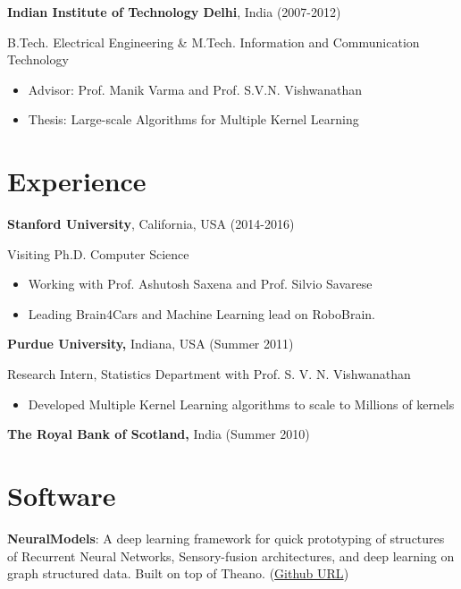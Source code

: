 \documentclass[line,margin]{res}
\begin{document}
\begin{resume}
 {\bf Indian Institute of Technology Delhi}, India  \hfill (2007-2012)
   
 \vspace{-4mm}
  \hspace {4mm } B.Tech. Electrical Engineering \& M.Tech. Information
and Communication Technology
 \begin{itemize} \itemsep -2pt  %
 \item Advisor: Prof. Manik Varma and Prof. S.V.N. Vishwanathan
 \item Thesis: Large-scale Algorithms for Multiple Kernel Learning
 \end{itemize}

\section{Experience}

{\bf Stanford University}, California, USA  \hfill (2014-2016)
 
 \vspace{-4mm}
  \hspace {4mm } Visiting Ph.D. Computer Science 
 \begin{itemize} \itemsep -2pt  %
 \item Working with Prof. Ashutosh Saxena and Prof. Silvio Savarese
 \item Leading Brain4Cars and Machine Learning lead on RoboBrain.
 \end{itemize}

{\bf Purdue University,} Indiana, USA \hfill (Summer 2011)
    
 \vspace{-3mm}
  \hspace {4mm }Research Intern, Statistics Department with Prof. S. V. N. Vishwanathan
 \begin{itemize} \itemsep -2pt  %
 \item Developed Multiple Kernel Learning algorithms to scale to Millions of
kernels
 \end{itemize}

{\bf The Royal Bank of Scotland,} India  \hfill  (Summer 2010)
   


 \section{Software}
 
 \textbf{NeuralModels}: A deep learning framework for quick prototyping of structures of Recurrent Neural Networks, Sensory-fusion architectures, and deep learning on graph structured data. Built on top of Theano.   (\href{https://github.com/asheshjain399/NeuralModels}{Github URL})
 

\end{resume}
\end{document}
